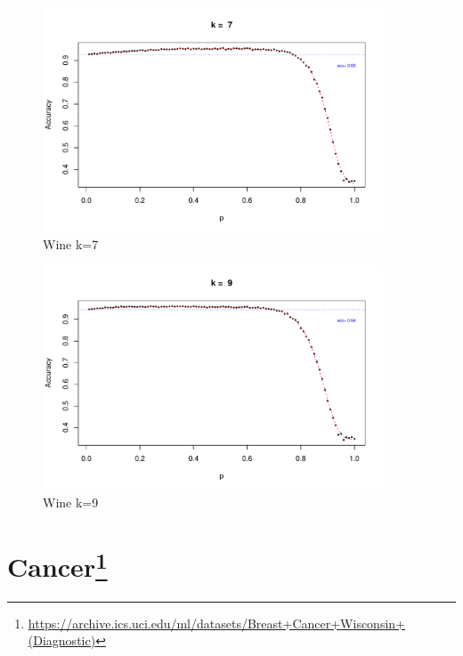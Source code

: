 \documentclass{article}
\begin{document}
\begin{figure}
 \centering
 \includegraphics[width=0.9\textwidth]{./figures/Wine_k7.pdf}
 \caption{Wine k=7}
 \label{fig:Wine7}
\end{figure}
\begin{figure}
 \centering
 \includegraphics[width=0.9\textwidth]{./figures/Wine_k9.pdf}
 \caption{Wine k=9}
 \label{fig:Wine9}
\end{figure}


\FloatBarrier
\section[Cancer]{Cancer\footnote{\url{https://archive.ics.uci.edu/ml/datasets/Breast+Cancer+Wisconsin+(Diagnostic)}}}
\end{document}
